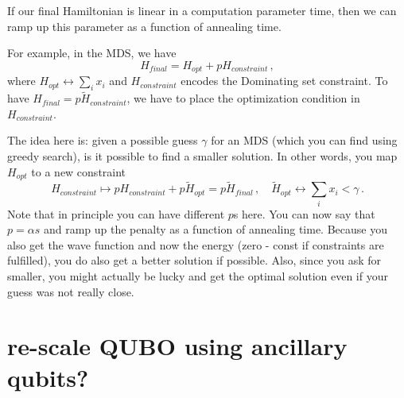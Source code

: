 \documentclass[]{article}
\begin{document}
If our final Hamiltonian is linear in a computation parameter time, then we can ramp up this parameter as a function of annealing time.

For example, in the MDS, we have
\begin{equation}
	H_{final} = H_{opt} + p H_{constraint} \, ,
\end{equation}
where $H_{opt} \leftrightarrow \sum_i x_i$ and $H_{constraint}$ encodes the Dominating set constraint.
To have $H_{final} = p \tilde{H}_{constraint}$, we have to place the optimization condition in $H_{constraint}$.

The idea here is: given a possible guess $\gamma$ for an MDS (which you can find using greedy search), is it possible to find a smaller solution.
In other words, you map $H_{opt}$ to a new constraint
\begin{equation}
	 H_{constraint} \mapsto  p  H_{constraint} + p  \tilde H_{opt} = p \tilde H_{final} 
	\, , \quad
	\tilde H_{opt} \leftrightarrow \sum_i x_i < \gamma \, .
\end{equation}
Note that in principle you can have different $p$s here.
You can now say that $p = \alpha s$ and ramp up the penalty as a function of annealing time.
Because you also get the wave function and now the energy (zero - const if constraints are fulfilled), you do also get a better solution if possible.
Also, since you ask for smaller, you might actually be lucky and get the optimal solution even if your guess was not really close.


\section{re-scale QUBO using ancillary qubits?}
\end{document}
